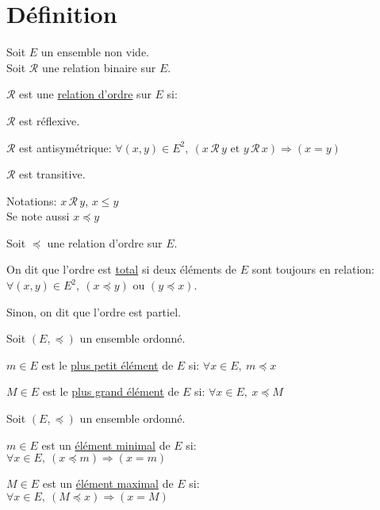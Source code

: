 \documentclass[12pt,twoside,a4paper]{article}
\author{MPSI 2}
\begin{document}
	\maketitle
	\section{D\'efinition}
		Soit $E$ un ensemble non vide.\\
		Soit $\mathcal{R}$ une relation binaire sur $E$.
		\begin{defi}
			$\mathcal{R}$ est une \underline{relation d'ordre} sur $E$ si:
			\begin{liste}
				\item $\mathcal{R}$ est r\'eflexive.
				\item $\mathcal{R}$ est antisym\'etrique: $\forall(x,y)\in E^2,\ (x\,\mathcal{R}\,y \text{ et }y\,\mathcal{R}\,x)\Rightarrow(x=y)$
				\item $\mathcal{R}$ est transitive.
			\end{liste}
		\end{defi}
		\begin{flushleft}
			Notations: $x\,\mathcal{R}\,y$, $x\leq y$\\
			Se note aussi $x\preccurlyeq y$
		\end{flushleft}
		\begin{defi}
			Soit $\preccurlyeq$ une relation d'ordre sur $E$.\\
			\begin{liste}
				\item On dit que l'ordre est \underline{total} si deux \'el\'ements de $E$ sont toujours en relation:\\
					$\forall(x,y)\in E^2,\ (x\preccurlyeq y)$ ou $(y\preccurlyeq x)$.
				\item Sinon, on dit que l'ordre est partiel.
			\end{liste}
		\end{defi}
		\begin{defi}
			Soit $(E,\preccurlyeq)$ un ensemble ordonn\'e.
			\begin{liste}
				\item $m\in E$ est le \underline{plus petit \'el\'ement} de $E$ si: $\forall x\in E,\ m\preccurlyeq x$
				\item $M\in E$ est le \underline{plus grand \'el\'ement} de $E$ si: $\forall x\in E,\ x\preccurlyeq M$
			\end{liste}
		\end{defi}
		\begin{defi}
		Soit $(E,\preccurlyeq)$ un ensemble ordonn\'e.
			\begin{liste}
				\item $m\in E$ est un \underline{\'el\'ement minimal} de $E$ si:\\
					$\forall x\in E,\ (x \preccurlyeq m)\Rightarrow (x=m)$
				\item $M\in E$ est un \underline{\'el\'ement maximal} de $E$ si:\\
					$\forall x\in E,\ (M\preccurlyeq x)\Rightarrow (x=M)$
			\end{liste}
		\end{defi}
\end{document}
